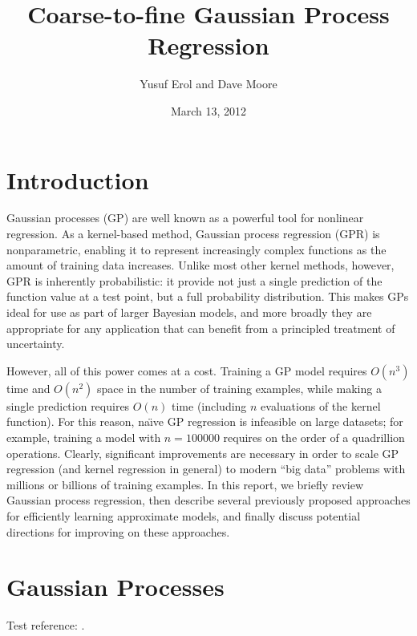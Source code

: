 \documentclass{article}
\begin{document}
\title{Coarse-to-fine Gaussian Process Regression}
\author{Yusuf Erol and Dave Moore}
\date{March 13, 2012}
\maketitle

\section{Introduction}

Gaussian processes (GP) are well known as a powerful tool for nonlinear regression. As a kernel-based method, Gaussian process regression (GPR) is nonparametric, enabling it to represent increasingly complex functions as the amount of training data increases. Unlike most other kernel methods, however, GPR is inherently probabilistic: it provide not just a single prediction of the function value at a test point, but a full probability distribution. This makes GPs ideal for use as part of larger Bayesian models, and more broadly they are appropriate for any application that can benefit from a principled treatment of uncertainty. 

However, all of this power comes at a cost. Training a GP model requires $O(n^3)$ time and $O(n^2)$ space in the number of training examples, while making a single prediction requires $O(n)$ time (including $n$ evaluations of the kernel function). For this reason, na\"{\i}ve GP regression is infeasible on large datasets; for example, training a model with $n = 100000$ requires on the order of a quadrillion operations. Clearly, significant improvements are necessary in order to scale GP regression (and kernel regression in general) to modern ``big data'' problems with millions or billions of training examples. In this report, we briefly review Gaussian process regression, then describe several previously proposed approaches for efficiently learning approximate models, and finally discuss potential directions for improving on these approaches. 

\section{Gaussian Processes}



Test reference: \cite{rasmussen06}. 
\end{document}
